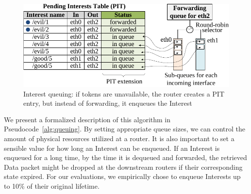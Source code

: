 \documentclass[10pt,conference]{IEEEtran}
\begin{document}

\begin{figure}[t]
  \centering
  \includegraphics[scale=0.6]{queue}
  \caption{Interest queuing: if tokens are unavailable, the router creates a PIT entry, but instead of forwarding, it enqueues the Interest}
  \label{fig:queueing}
  \vspace{-0.3cm}
\end{figure}

We present a formalized description of this algorithm in Pseudocode~\ref{alg:queuing}. 
By setting appropriate queue sizes, we can control the amount of physical resources utilized at a router.
It is also important to set a sensible value for how long an Interest can be enqueued. 
If an Interest is enqueued for a long time, by the time it is dequeued and forwarded, the retrieved Data packet might be dropped at the downstream routers if their corresponding state expired. 
For our evaluations, we empirically chose to enqueue Interests up to 10\% of their original lifetime.
\end{document}
